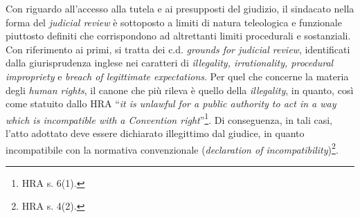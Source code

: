 \documentclass[12pt,it,a4paper,]{report}
\begin{document}
Con riguardo all'accesso alla tutela e ai presupposti del giudizio, il
sindacato nella forma del \emph{judicial review} è sottoposto a limiti
di natura teleologica e funzionale piuttosto definiti che corrispondono
ad altrettanti limiti procedurali e sostanziali. Con riferimento ai
primi, si tratta dei c.d. \emph{grounds for judicial review},
identificati dalla giurisprudenza inglese nei caratteri di
\emph{illegality, irrationality, procedural impropriety} e \emph{breach
of legittimate expectations}. Per quel che concerne la materia degli
\emph{human rights}, il canone che più rileva è quello della
\emph{illegality}, in quanto, così come statuito dallo HRA ``\emph{it is
unlawful for a public authority to act in a way which is incompatible
with a Convention right}''\footnote{HRA s. 6(1).}. Di conseguenza, in
tali casi, l'atto adottato deve essere dichiarato illegittimo dal
giudice, in quanto incompatibile con la normativa convenzionale
(\emph{declaration of incompatibility})\footnote{HRA s. 4(2).}.
\end{document}
